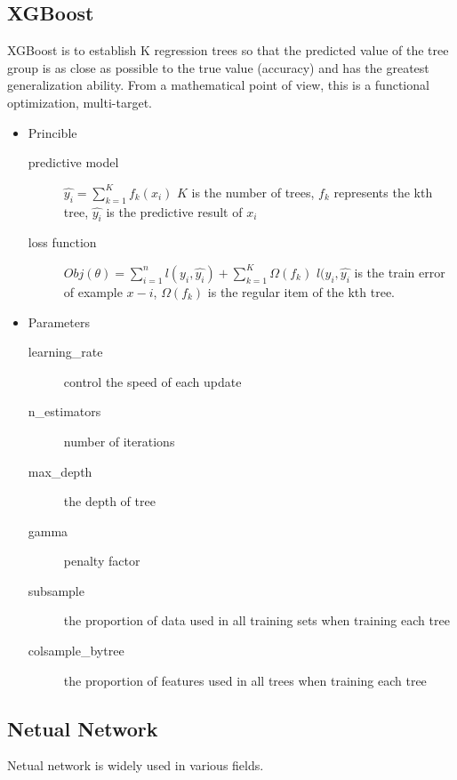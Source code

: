 \subsection{XGBoost}
 
XGBoost is to establish K regression trees 
so that the predicted value of 
the tree group is as close as possible to 
the true value (accuracy) and 
has the greatest generalization ability. 
From a mathematical point of view, 
this is a functional optimization, multi-target.

\begin{itemize}
	\item Princible
	\begin{description}
		\item[predictive model] $\hat{y_i}=\sum\nolimits_{k=1}^K f_k(x_i)$
		$K$ is the number of trees,
		$f_k$ represents the kth tree,
		$\hat{y_i}$ is the predictive result of $x_i$
		\item[loss function] $Obj(\theta)=\sum\nolimits_{i=1}^n l(y_i,\hat{y_i})+
		\sum\nolimits_{k=1}^K \Omega(f_k)$
		$l(y_i,\hat{y_i}$ is the train error of example 
		$x-i$, $\Omega(f_k)$ is the regular item of the kth tree.
	\end{description}
	
	\item Parameters
	\begin{description}
		\item[learning_rate]  control the speed of each update
		\item[n_estimators] number of iterations
		\item[max_depth] the depth of tree
		\item[gamma] penalty factor%
		\item[subsample] the proportion of data used in 
		all training sets when training each tree
		\item[colsample_bytree] the proportion of features used 
		in all trees when training each tree
	\end{description}
\end{itemize} 

\subsection{Netual Network}

Netual network is widely used in various fields.

